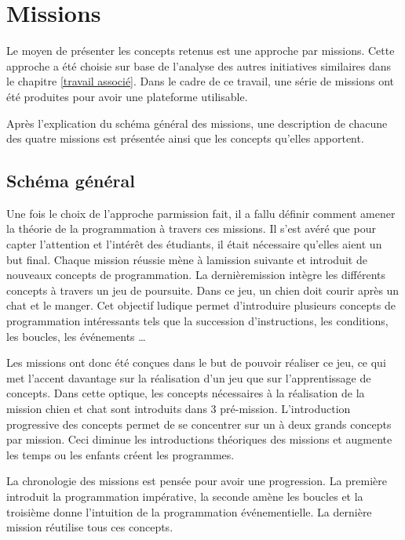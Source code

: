 \section{Missions}
\label{mission}
Le moyen de présenter les concepts retenus est une approche par \glspl{mission}. Cette approche a été choisie sur base de l'analyse des autres initiatives similaires dans le chapitre \ref{travail associé}. Dans le cadre de ce travail, une série de \glspl{mission} ont été produites pour avoir une plateforme utilisable.


Après l'explication du schéma général des \glspl{mission}, une description de chacune des quatre \glspl{mission} est présentée ainsi que les concepts qu'elles apportent.

\subsection{Schéma général}
Une fois le choix de l'approche par\gls{mission} fait, il a fallu définir comment amener la théorie de la programmation à travers ces \glspl{mission}. Il s'est avéré que pour capter l'attention et l'intérêt des étudiants, il était nécessaire qu'elles aient un but final. Chaque \gls{mission} réussie mène à la\gls{mission} suivante et introduit de nouveaux concepts de programmation. La dernière\gls{mission} intègre les différents concepts à travers un jeu de poursuite. Dans ce jeu, un chien doit courir après un chat et le manger. Cet objectif ludique permet d'introduire plusieurs concepts de programmation intéressants tels que la succession d'instructions, les conditions, les boucles, les événements \ldots

Les \glspl{mission} ont donc été conçues dans le but de pouvoir réaliser ce jeu, ce qui met l'accent davantage sur la réalisation d'un jeu que sur l'apprentissage de concepts. Dans cette optique, les concepts nécessaires à la réalisation de la \gls{mission} chien et chat sont introduits dans 3 pré-mission. L'introduction progressive des concepts permet de se concentrer sur un à deux grands concepts par \gls{mission}. Ceci diminue les introductions théoriques des \glspl{mission} et augmente les temps ou les enfants créent les programmes.


La chronologie des \glspl{mission} est pensée pour avoir une progression. La première introduit la programmation impérative, la seconde amène les boucles et la troisième donne l'intuition de la programmation événementielle. La dernière \gls{mission} réutilise tous ces concepts.

